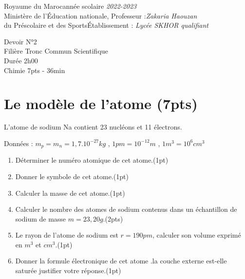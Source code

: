 \documentclass[12pt]{article}
\newcommand\headerMe[2]{\noindent{}#1\hfill#2}
\begin{document}
\headerMe{Royaume du Maroc}{année scolaire \emph{2022-2023}}\\
\headerMe{Ministère de l'Éducation nationale, }{  Professeur :\emph{Zakaria Haouzan}}\\
\headerMe{du Préscolaire et des Sports}{Établissement : \emph{Lycée SKHOR qualifiant}}\\

\begin{center}

    \vspace{-1.5cm}
Devoir  N°2 \\
   Filière Tronc Commun Scientifique\\
Durée 2h00
\\
\hrulefill
\Large{Chimie 7pts - 36min}
\hrulefill\\

\end{center}
 
    \vspace{-1.2cm}
    
\section*{Le modèle de l'atome  \dotfill (7pts) }
L’atome de sodium Na contient 23 nucléons et 11
électrons.

Données : $m_p = m_n = 1,7.10^{-27}kg$ , $1pm = 10^{-12}m$ , $1m^3  =10^6 cm^3$

\begin{enumerate}

\item Déterminer le numéro atomique de cet
atome.\dotfill(1pt)
\item  Donner le symbole de cet atome.\dotfill(1pt)
\item  Calculer la masse de cet atome.\dotfill(1pt)
\item Calculer le nombre des atomes de sodium
contenus dans un échantillon de sodium
de masse $m=23,20g$.\dotfill(2pts)
\item  Le rayon de l’atome de sodium est
$r=190pm$, calculer son volume exprimé en $m^3$ et $cm^3$.\dotfill(1pt)
\item  Donner la formule électronique de cet
atome .la couche externe est-elle saturée
justifier votre réponse.\dotfill(1pt)
\end{enumerate}
\end{document}
